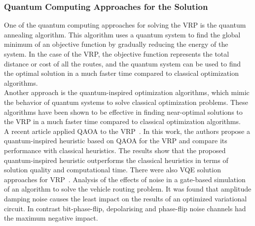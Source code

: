 \subsubsection{Quantum Computing Approaches for the Solution}
One of the quantum computing approaches for solving the VRP is the quantum annealing algorithm.
This algorithm uses a quantum system to find the global minimum of an objective function by gradually reducing the
energy of the system. In the case of the VRP, the objective function represents the total distance or cost of all
the routes, and the quantum system can be used to find the optimal solution in a much faster time compared to classical
optimization algorithms.\\
Another approach is the quantum-inspired optimization algorithms, which mimic the behavior of quantum systems to solve
classical optimization problems. These algorithms have been shown to be effective in finding near-optimal solutions to
the VRP in a much faster time compared to classical optimization algorithms.\\
A recent article applied QAOA to the VRP~\cite{9605345}. In this work, the authors propose a quantum-inspired heuristic
based on QAOA for the VRP and
compare its performance with classical heuristics. The results show that the proposed quantum-inspired heuristic
outperforms the classical heuristics in terms of solution quality and computational time.
There were also VQE solution approaches for VRP~\cite{mohanty2022analysis}.
Analysis of the effects of noise in a gate-based
simulation of an algorithm to solve the vehicle routing problem.
It was found that amplitude damping
noise causes the least impact on the results of an optimized
variational circuit. In contrast bit-phase-flip, depolarising and
phase-flip noise channels had the maximum negative impact.




